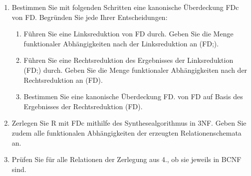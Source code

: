 \documentclass{lehramt-informatik-aufgabe}
\begin{document}
\begin{enumerate}

\item Bestimmen Sie mit folgenden Schritten eine kanonische Überdeckung
FDc von FD. Begründen Sie jede Ihrer Entscheidungen:

\begin{enumerate}


\item Führen Sie eine Linksreduktion von FD durch. Geben Sie die Menge
funktionaler Abhängigkeiten nach der Linksreduktion an (FD;).

\begin{liAntwort}
\end{liAntwort}


\item Führen Sie eine Rechtsreduktion des Ergebnisses der Linksreduktion
(FD;) durch. Geben Sie die Menge funktionaler Abhängigkeiten nach der
Rechtsreduktion an (FD).

\begin{liAntwort}
\end{liAntwort}


\item Bestimmen Sie eine kanonische Überdeckung FD. von FD auf Basis des
Ergebnisses der Rechtsreduktion (FD).

\begin{liAntwort}
\end{liAntwort}

\end{enumerate}

\item Zerlegen Sie R mit FDc mithilfe des Synthesealgorithmus in 3NF.
Geben Sie zudem alle funktionalen Abhängigkeiten der erzeugten
Relationenschemata an.


\item Prüfen Sie für alle Relationen der Zerlegung aus 4., ob sie
jeweils in BCNF sind.

\end{enumerate}
\end{document}
